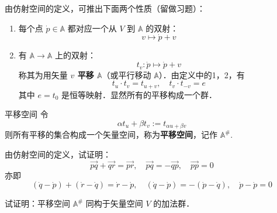 由仿射空间的定义，可推出下面两个性质（留做习题）：
\begin{enumerate}
\item 每个点 $\dot p\in \mathbb A$ 都对应一个从 $V$ 到 $\mathbb A$ 的双射：
\begin{equation}
v\mapsto \dot p+v
\end{equation}

\item 有 $\mathbb A\rightarrow\mathbb A$ 上的双射：
\begin{equation}\label{AfSp_eq3}
t_v:\dot p\mapsto\dot p+v
\end{equation}
 称其为用矢量 \textbf{$v$ 平移 $\mathbb A$}（或平行移动 $\mathbb A$）．由定义中的1，2，有
 \begin{equation}
 t_u\cdot t_v=t_{u+v},\quad t_v\cdot t_{-v}=e
 \end{equation}
  其中 $e=t_0$ 是恒等映射．显然所有的平移构成一个群．
\end{enumerate}
\begin{definition}{平移空间}
令
\begin{equation}
\alpha t_u+\beta t_v:= t_{\alpha u+\beta v}
\end{equation}
则所有平移的集合构成一个矢量空间，称为\textbf{平移空间}，记作 $\mathbb A^{\#}$.
\end{definition}
\begin{example}{}
由仿射空间的定义，试证明：
\begin{equation}
\overrightarrow{pq}+\overrightarrow{qr}=\overrightarrow{pr},\quad \overrightarrow{pq}=-\overrightarrow{qp},\quad\overrightarrow{pp}=0
\end{equation}
亦即
\begin{equation}
(\dot q-\dot p )+(\dot r-\dot q)=\dot r-\dot p,\quad(\dot q-\dot p)=-(\dot p-\dot q),\quad\dot p-\dot p=0
\end{equation}
\end{example}

\begin{exercise}{}\label{AfSp_exe1}
试证明：平移空间 $\mathbb A^{\#}$ 同构于矢量空间 $V$ 的加法群．
\end{exercise}

